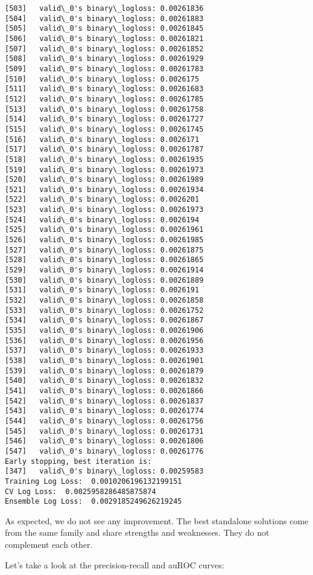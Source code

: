 \documentclass[11pt]{article}
\begin{document}
\begin{Verbatim}[commandchars=\\\{\}]
[503]	valid\_0's binary\_logloss: 0.00261836
[504]	valid\_0's binary\_logloss: 0.00261883
[505]	valid\_0's binary\_logloss: 0.00261845
[506]	valid\_0's binary\_logloss: 0.00261821
[507]	valid\_0's binary\_logloss: 0.00261852
[508]	valid\_0's binary\_logloss: 0.00261929
[509]	valid\_0's binary\_logloss: 0.00261783
[510]	valid\_0's binary\_logloss: 0.0026175
[511]	valid\_0's binary\_logloss: 0.00261683
[512]	valid\_0's binary\_logloss: 0.00261785
[513]	valid\_0's binary\_logloss: 0.00261758
[514]	valid\_0's binary\_logloss: 0.00261727
[515]	valid\_0's binary\_logloss: 0.00261745
[516]	valid\_0's binary\_logloss: 0.0026171
[517]	valid\_0's binary\_logloss: 0.00261787
[518]	valid\_0's binary\_logloss: 0.00261935
[519]	valid\_0's binary\_logloss: 0.00261973
[520]	valid\_0's binary\_logloss: 0.00261989
[521]	valid\_0's binary\_logloss: 0.00261934
[522]	valid\_0's binary\_logloss: 0.0026201
[523]	valid\_0's binary\_logloss: 0.00261973
[524]	valid\_0's binary\_logloss: 0.0026194
[525]	valid\_0's binary\_logloss: 0.00261961
[526]	valid\_0's binary\_logloss: 0.00261985
[527]	valid\_0's binary\_logloss: 0.00261875
[528]	valid\_0's binary\_logloss: 0.00261865
[529]	valid\_0's binary\_logloss: 0.00261914
[530]	valid\_0's binary\_logloss: 0.00261889
[531]	valid\_0's binary\_logloss: 0.0026191
[532]	valid\_0's binary\_logloss: 0.00261858
[533]	valid\_0's binary\_logloss: 0.00261752
[534]	valid\_0's binary\_logloss: 0.00261867
[535]	valid\_0's binary\_logloss: 0.00261906
[536]	valid\_0's binary\_logloss: 0.00261956
[537]	valid\_0's binary\_logloss: 0.00261933
[538]	valid\_0's binary\_logloss: 0.00261901
[539]	valid\_0's binary\_logloss: 0.00261879
[540]	valid\_0's binary\_logloss: 0.00261832
[541]	valid\_0's binary\_logloss: 0.00261866
[542]	valid\_0's binary\_logloss: 0.00261837
[543]	valid\_0's binary\_logloss: 0.00261774
[544]	valid\_0's binary\_logloss: 0.00261756
[545]	valid\_0's binary\_logloss: 0.00261731
[546]	valid\_0's binary\_logloss: 0.00261806
[547]	valid\_0's binary\_logloss: 0.00261776
Early stopping, best iteration is:
[347]	valid\_0's binary\_logloss: 0.00259583
Training Log Loss:  0.0010206196132199151
CV Log Loss:  0.0025958286485875874
Ensemble Log Loss:  0.0029185249626219245

    \end{Verbatim}

    As expected, we do not see any improvement. The best standalone
solutions come from the same family and share strengths and weaknesses.
They do not complement each other.

Let's take a look at the precision-recall and auROC curves:
\end{document}

